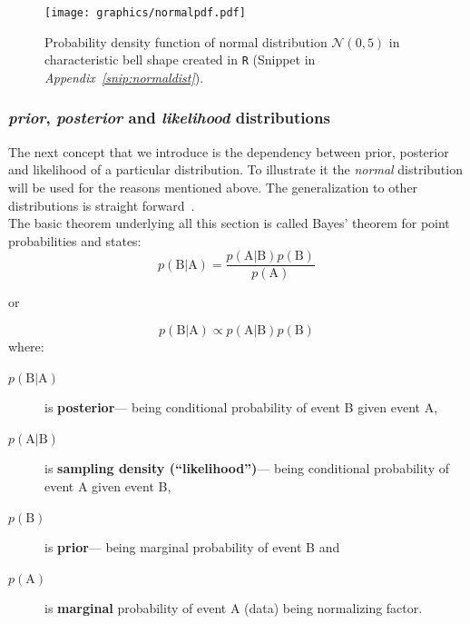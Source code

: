 \documentclass[12pt, a4paper, pdflatex, leqno]{report}
\begin{document}
\begin{figure}[htbp]
\centering
\texttt{[image: graphics/normalpdf.pdf]}
\begin{tiny}
\caption{Probability density function of normal distribution $\mathcal{N}\left( 0, 5 \right)$ in characteristic bell shape created in \texttt{R} (Snippet in \emph{Appendix~\ref{snip:normaldist}}).\label{fig:normaldist}}
\end{tiny}
\vspace{1cm}
\end{figure}



\subsubsection{\emph{prior}, \emph{posterior} and \emph{likelihood} distributions}
The next concept that we introduce is the dependency between prior, posterior and likelihood of a particular distribution. To illustrate it the \emph{normal} distribution will be used for the reasons mentioned above. The generalization to other distributions is straight forward~\citep{gelman2003bayesian}.\\

The basic theorem underlying all this section is called Bayes' theorem for point probabilities and states:
$$
p \left( \mathrm{B} | \mathrm{A} \right) = \frac{  p \left( \mathrm{A} | \mathrm{B} \right) p \left( \mathrm{B} \right) }{ p \left( \mathrm{A} \right) }
$$
\begin{center}
or
\end{center}
$$
p \left( \mathrm{B} | \mathrm{A} \right) \propto p \left( \mathrm{A} | \mathrm{B} \right) p \left( \mathrm{B} \right)
$$
where:
\begin{description}
\item[$p \left( \mathrm{B} | \mathrm{A} \right)$] is \textbf{posterior}--- being conditional probability of event \textrm{B} given event \textrm{A},
\item[$p \left( \mathrm{A} | \mathrm{B} \right)$] is \textbf{sampling density (``likelihood'')}--- being conditional probability of event \textrm{A} given event \textrm{B},
\item[$p \left( \mathrm{B} \right)$] is \textbf{prior}--- being marginal probability of event \textrm{B} and
\item[$p \left( \mathrm{A} \right)$] is \textbf{marginal} probability of event \textrm{A} (data) being normalizing factor.
\end{description}
\end{document}
